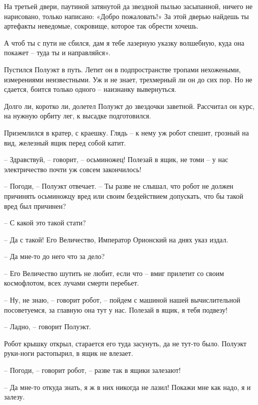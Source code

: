 \documentclass[ebook,oneside,final,openright]{memoir}
\begin{document}
\par
На третьей двери, паутиной затянутой да звездной пылью засыпанной, ничего не нарисовано, только написано: «Добро пожаловать!» За этой дверью найдешь ты артефакты неведомые, сокровище, которое так обрести хочешь.\par
\par
А чтоб ты с пути не сбился, дам я тебе лазерную указку волшебную, куда она покажет – туда ты и направляйся».\par
\par
Пустился Полуэкт в путь. Летит он в подпространстве тропами нехожеными, измерениями неизвестными. Уж и не знает, трехмерный ли он до сих пор. Но не сдается, боится только одного – наизнанку вывернуться.\par
\par
Долго ли, коротко ли, долетел Полуэкт до звездочки заветной. Рассчитал он курс, на нужную орбиту лег, к высадке подготовился.\par
\par
Приземлился в кратер, с краешку. Глядь – к нему уж робот спешит, грозный на вид, железный ящик перед собой катит.\par
– Здравствуй, – говорит, – осьминожец! Полезай в ящик, не томи – у нас электричество почти уж совсем закончилось!\par
– Погоди, – Полуэкт отвечает. – Ты разве не слышал, что робот не должен причинять осьминожцу вред или своим бездействием допускать, что бы такой вред был причинен?\par
– С какой это такой стати?\par
– Да с такой! Его Величество, Император Орионский на днях указ издал.\par
– Да мне-то до него что за дело?\par
– Его Величество шутить не любит, если что – вмиг прилетит со своим космофлотом, всех лучами смерти перебьет.\par
– Ну, не знаю, – говорит робот, – пойдем с машиной нашей вычислительной посоветуемся, за главную она тут у нас. Полезай в ящик, я тебя подвезу!\par
– Ладно, – говорит Полуэкт.\par
Робот крышку открыл, старается его туда засунуть, да не тут-то было. Полуэкт руки-ноги растопырил, в ящик не влезает. \par
– Погоди, – говорит робот, – разве так в ящики залезают! \par
– Да мне-то откуда знать, я ж в них никогда не лазил! Покажи мне как надо, я и залезу. \par
\end{document}
